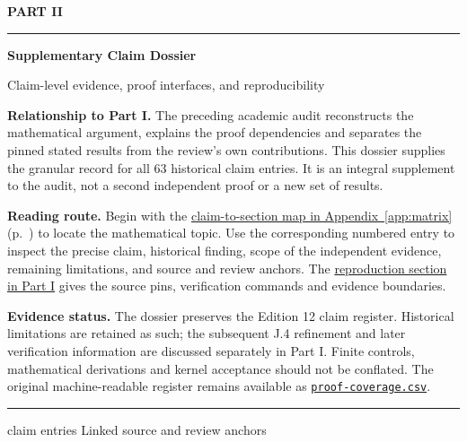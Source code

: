 \documentclass[11pt,letterpaper]{article}
\theoremstyle{definition}\newtheorem{definition}[theorem]{Definition}\newtheorem{example}[theorem]{Example}
\theoremstyle{remark}\newtheorem{remark}[theorem]{Remark}
\newcommand{\aud}[2]{\href{https://github.com/nousentllc/VP-VNP-Review/blob/567303d0bcf4f9d54390437b137752446e58ccd6/#1}{#2}}
\begin{document}
\clearpage
{}
{}
\label{part:dossier}
\thispagestyle{plain}
\vspace*{1.10in}
{\color{navy}\sffamily\large\bfseries PART II\par}
\vspace{0.65em}
{\noindent\color{navy}\rule{\textwidth}{0.8pt}\par}
\vspace{1.25em}
{\Huge\bfseries Supplementary Claim Dossier\par}
\vspace{0.75em}
{\Large Claim-level evidence, proof interfaces, and reproducibility\par}
\vspace{2.3em}
\noindent\textbf{Relationship to Part I.} The preceding academic audit reconstructs the mathematical argument, explains the proof dependencies and separates the pinned stated results from the review's own contributions. This dossier supplies the granular record for all 63 historical claim entries. It is an integral supplement to the audit, not a second independent proof or a new set of results.

\bigskip
\noindent\textbf{Reading route.} Begin with the \hyperref[app:matrix]{claim-to-section map in Appendix~\ref*{app:matrix}} (p.~\pageref{app:matrix}) to locate the mathematical topic. Use the corresponding numbered entry to inspect the precise claim, historical finding, scope of the independent evidence, remaining limitations, and source and review anchors. The \hyperref[sec:repro]{reproduction section in Part I} gives the source pins, verification commands and evidence boundaries.

\bigskip
\noindent\textbf{Evidence status.} The dossier preserves the Edition 12 claim register. Historical limitations are retained as such; the subsequent J.4 refinement and later verification information are discussed separately in Part I. Finite controls, mathematical derivations and kernel acceptance should not be conflated. The original machine-readable register remains available as \aud{report/proof-coverage.csv}{\texttt{proof-coverage.csv}}.

\vfill
{\noindent\color{navy}\rule{\textwidth}{0.5pt}\par}
{\small{} claim entries \quad\textbullet\quad Linked source and review anchors\par}
\clearpage
\end{document}
